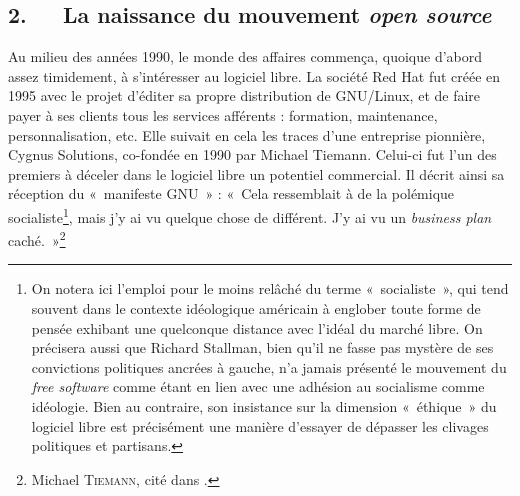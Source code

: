 \documentclass{FramateX}
\begin{document}
\begin{refsection}
\section*{2.~~~La naissance du mouvement \textit{open source}}
{}

Au milieu des années 1990, le monde des affaires commença, quoique
d'abord assez timidement, à s'intéresser au logiciel libre. La société
Red Hat fut créée en 1995 avec le projet d'éditer sa propre
distribution de GNU/Linux, et de faire payer à ses clients tous les
services afférents : formation, maintenance, personnalisation, etc.
Elle suivait en cela les traces d'une entreprise pionnière, Cygnus
Solutions, co-fondée en 1990 par Michael Tiemann. Celui-ci fut l'un des
premiers à déceler dans le logiciel libre un potentiel commercial. Il
décrit ainsi sa réception du «~manifeste GNU~» : «~Cela ressemblait à
de la polémique socialiste\footnote{On notera ici
l'emploi pour le moins relâché du terme
«~socialiste~», qui tend souvent dans le contexte idéologique américain
à englober toute forme de pensée exhibant une quelconque distance avec
l'idéal du marché libre. On précisera aussi que
Richard Stallman, bien qu'il ne fasse pas mystère de
ses convictions politiques ancrées à gauche, n'a
jamais présenté le mouvement du \textit{free software} comme
étant en lien avec une adhésion au socialisme comme idéologie. Bien au
contraire, son insistance sur la dimension «~éthique~» du logiciel
libre est précisément une manière d'essayer de
dépasser les clivages politiques et partisans.}, mais j'y ai vu
quelque chose de différent. J'y ai vu un \textit{business plan} caché.~»\footnote{Michael \textsc{Tiemann}, cité dans \cite[p.~181]{williamsrichard2010}.}


\end{refsection}
\end{document}
